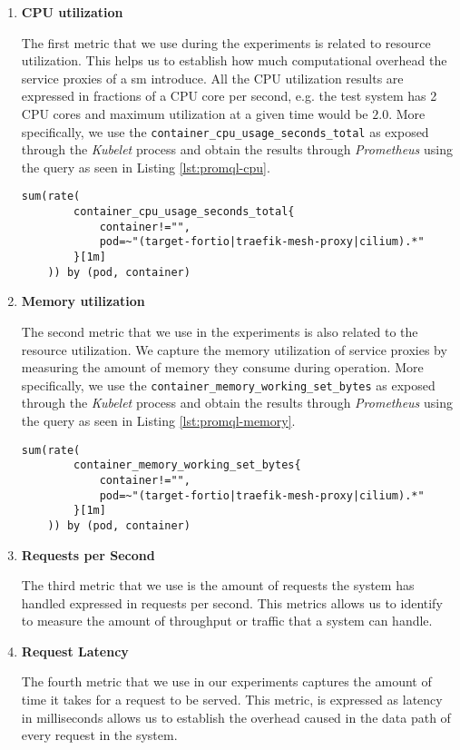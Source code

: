 \begin{enumerate}[label=\textbf{M\arabic*}, leftmargin=3\parindent]
    \item \textbf{CPU utilization}
    \label{exp:metric:1}
    
    The first metric that we use during the experiments is related to resource utilization. This helps us to establish how much computational overhead the service proxies of a \gls{sm} introduce. All the CPU utilization results are expressed in fractions of a CPU core per second, e.g. the test system has 2 CPU cores and maximum utilization at a given time would be $2.0$. More specifically, we use the \verb+container_cpu_usage_seconds_total+ as exposed through the \textit{Kubelet} process and obtain the results through \textit{Prometheus} using the query as seen in Listing \ref{lst:promql-cpu}.
    
    \begin{lstlisting}[caption=PromQL query for CPU metric, label=lst:promql-cpu] 
    sum(rate(
        container_cpu_usage_seconds_total{
            container!="",
            pod=~"(target-fortio|traefik-mesh-proxy|cilium).*"
        }[1m]
    )) by (pod, container)
    \end{lstlisting}

    
    \item \textbf{Memory utilization}
    \label{exp:metric:2}
    
    The second metric that we use in the experiments is also related to the resource utilization. We capture the memory utilization of service proxies by measuring the amount of memory they consume during operation. More specifically, we use the \verb+container_memory_working_set_bytes+ as exposed through the \textit{Kubelet} process and obtain the results through \textit{Prometheus} using the query as seen in Listing \ref{lst:promql-memory}.
    
    
    \begin{lstlisting}[caption=PromQL query for CPU metric, label=lst:promql-memory] 
    sum(rate(
        container_memory_working_set_bytes{
            container!="",
            pod=~"(target-fortio|traefik-mesh-proxy|cilium).*"
        }[1m]
    )) by (pod, container)
    \end{lstlisting}

    
    \item \textbf{Requests per Second}
    \label{exp:metric:3}
    
    The third metric that we use is the amount of requests the system has handled expressed in requests per second. This metrics allows us to identify to measure the amount of throughput or traffic that a system can handle. 

    \item \textbf{Request Latency}
    \label{exp:metric:4}
    
    The fourth metric that we use in our experiments captures the amount of time it takes for a request to be served. This metric, is expressed as latency in milliseconds allows us to establish the overhead caused in the data path of every request in the system.

\end{enumerate}


